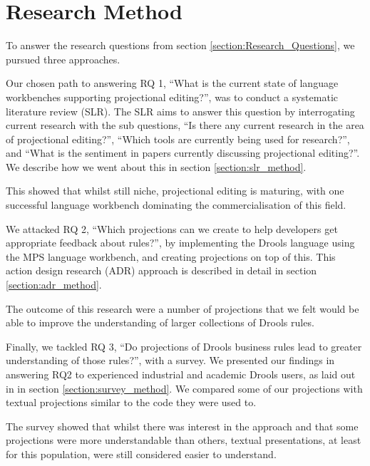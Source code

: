 \section{Research Method}
\label{section:Research_Method}

To answer the research questions from section \ref{section:Research_Questions}, we pursued three approaches.

Our chosen path to answering RQ 1, ``What is the current state of language workbenches supporting projectional editing?'', was to conduct a systematic literature review (SLR).
The SLR aims to answer this question by interrogating current research with the sub questions, ``Is there any current research in the area of projectional editing?'',  ``Which tools are currently being used for research?'', and ``What is the sentiment in papers currently discussing projectional editing?''.
We describe how we went about this in section \ref{section:slr_method}. 

This showed that whilst still niche, projectional editing is maturing, with one successful language workbench dominating the commercialisation of this field.

We attacked RQ 2, ``Which projections can we create to help developers get appropriate feedback about rules?'', by implementing the Drools language using the MPS language workbench, and creating projections on top of this.
This action design research (ADR) approach is described in detail in section \ref{section:adr_method}.

The outcome of this research were a number of projections that we felt would be able to improve the understanding of larger collections of Drools rules.

Finally, we tackled RQ 3, ``Do projections of Drools business rules lead to greater understanding of those rules?'', with a survey.
We presented our findings in answering RQ2 to experienced industrial and academic Drools users, as laid out in in section \ref{section:survey_method}.
We compared some of our projections with textual projections similar to the code they were used to.

The survey showed that whilst there was interest in the approach and that some projections were more understandable than others, textual presentations, at least for this population, were still considered easier to understand.